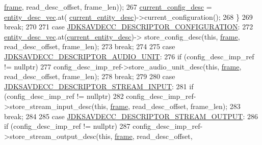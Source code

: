 \begin{DoxyCode}
      \hyperlink{gst__avb__playbin_8c_ac8e710e0b5e994c0545d75d69868c6f0}{frame}, read\_desc\_offset, frame\_len));
267                     \hyperlink{classavdecc__lib_1_1end__station__imp_a60b1af40d35e8a86b0082c54ab6cb6a8}{current\_config\_desc} = \hyperlink{classavdecc__lib_1_1end__station__imp_a72edab41bc56e3c1757944a7df188a3d}{entity\_desc\_vec}.at(
      \hyperlink{classavdecc__lib_1_1end__station__imp_afd78c89df26ba7641e1adb764c0e827d}{current\_entity\_desc})->current\_configuration();
268                 \}
269                 \textcolor{keywordflow}{break};
270 
271             \textcolor{keywordflow}{case} \hyperlink{group__descriptor_ga645687847f92dc28bcb37a7c334cb875}{JDKSAVDECC\_DESCRIPTOR\_CONFIGURATION}:
272                 \hyperlink{classavdecc__lib_1_1end__station__imp_a72edab41bc56e3c1757944a7df188a3d}{entity\_desc\_vec}.at(\hyperlink{classavdecc__lib_1_1end__station__imp_afd78c89df26ba7641e1adb764c0e827d}{current\_entity\_desc})->
      store\_config\_desc(\textcolor{keyword}{this}, \hyperlink{gst__avb__playbin_8c_ac8e710e0b5e994c0545d75d69868c6f0}{frame}, read\_desc\_offset, frame\_len);
273                 \textcolor{keywordflow}{break};
274 
275             \textcolor{keywordflow}{case} \hyperlink{group__descriptor_gab23787344ad4773f6486ee9d4bfa4cd2}{JDKSAVDECC\_DESCRIPTOR\_AUDIO\_UNIT}:
276                 \textcolor{keywordflow}{if} (config\_desc\_imp\_ref != \textcolor{keyword}{nullptr})
277                     config\_desc\_imp\_ref->store\_audio\_unit\_desc(\textcolor{keyword}{this}, \hyperlink{gst__avb__playbin_8c_ac8e710e0b5e994c0545d75d69868c6f0}{frame}, read\_desc\_offset, 
      frame\_len);
278                 \textcolor{keywordflow}{break};
279 
280             \textcolor{keywordflow}{case} \hyperlink{group__descriptor_ga4eb0b7597f11b5fc36f3625acd82e503}{JDKSAVDECC\_DESCRIPTOR\_STREAM\_INPUT}:
281                 \textcolor{keywordflow}{if} (config\_desc\_imp\_ref != \textcolor{keyword}{nullptr})
282                     config\_desc\_imp\_ref->store\_stream\_input\_desc(\textcolor{keyword}{this}, \hyperlink{gst__avb__playbin_8c_ac8e710e0b5e994c0545d75d69868c6f0}{frame}, read\_desc\_offset, 
      frame\_len);
283                 \textcolor{keywordflow}{break};
284 
285             \textcolor{keywordflow}{case} \hyperlink{group__descriptor_gab458eb4963f42bfa5591d5dd604bedce}{JDKSAVDECC\_DESCRIPTOR\_STREAM\_OUTPUT}:
286                 \textcolor{keywordflow}{if} (config\_desc\_imp\_ref != \textcolor{keyword}{nullptr})
287                     config\_desc\_imp\_ref->store\_stream\_output\_desc(\textcolor{keyword}{this}, \hyperlink{gst__avb__playbin_8c_ac8e710e0b5e994c0545d75d69868c6f0}{frame}, read\_desc\_offset, 

\end{DoxyCode}
